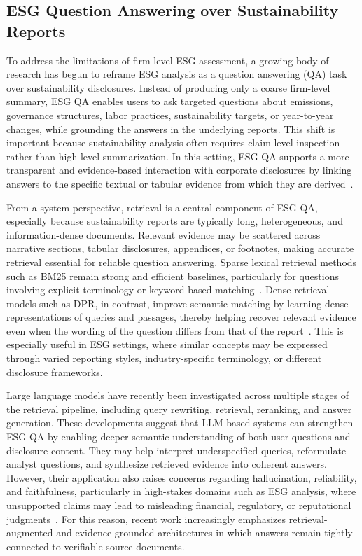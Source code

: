 \documentclass[sn-mathphys, oneside]{sn-jnl}
\begin{document}
\subsection{ESG Question Answering over Sustainability Reports}
To address the limitations of firm-level ESG assessment, a growing body of research has begun to reframe ESG analysis as a question answering (QA) task over sustainability disclosures. Instead of producing only a coarse firm-level summary, ESG QA enables users to ask targeted questions about emissions, governance structures, labor practices, sustainability targets, or year-to-year changes, while grounding the answers in the underlying reports. This shift is important because sustainability analysis often requires claim-level inspection rather than high-level summarization. In this setting, ESG QA supports a more transparent and evidence-based interaction with corporate disclosures by linking answers to the specific textual or tabular evidence from which they are derived~\cite{mishra2024docqa}.

From a system perspective, retrieval is a central component of ESG QA, especially because sustainability reports are typically long, heterogeneous, and information-dense documents. Relevant evidence may be scattered across narrative sections, tabular disclosures, appendices, or footnotes, making accurate retrieval essential for reliable question answering. Sparse lexical retrieval methods such as BM25 remain strong and efficient baselines, particularly for questions involving explicit terminology or keyword-based matching~\cite{robertson2009bm25}. Dense retrieval models such as DPR, in contrast, improve semantic matching by learning dense representations of queries and passages, thereby helping recover relevant evidence even when the wording of the question differs from that of the report~\cite{karpukhin2020dpr}. This is especially useful in ESG settings, where similar concepts may be expressed through varied reporting styles, industry-specific terminology, or different disclosure frameworks.

Large language models have recently been investigated across multiple stages of the retrieval pipeline, including query rewriting, retrieval, reranking, and answer generation. These developments suggest that LLM-based systems can strengthen ESG QA by enabling deeper semantic understanding of both user questions and disclosure content. They may help interpret underspecified queries, reformulate analyst questions, and synthesize retrieved evidence into coherent answers. However, their application also raises concerns regarding hallucination, reliability, and faithfulness, particularly in high-stakes domains such as ESG analysis, where unsupported claims may lead to misleading financial, regulatory, or reputational judgments~\cite{zhu2023llm4ir}. For this reason, recent work increasingly emphasizes retrieval-augmented and evidence-grounded architectures in which answers remain tightly connected to verifiable source documents.
\end{document}
